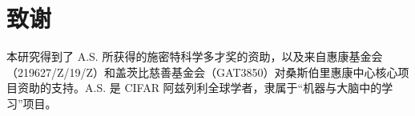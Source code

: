 \section*{致谢}
本研究得到了 A.S. 所获得的施密特科学多才奖的资助，以及来自惠康基金会（219627/Z/19/Z）和盖茨比慈善基金会（GAT3850）对桑斯伯里惠康中心核心项目资助的支持。A.S. 是 CIFAR 阿兹列利全球学者，隶属于“机器与大脑中的学习”项目。
